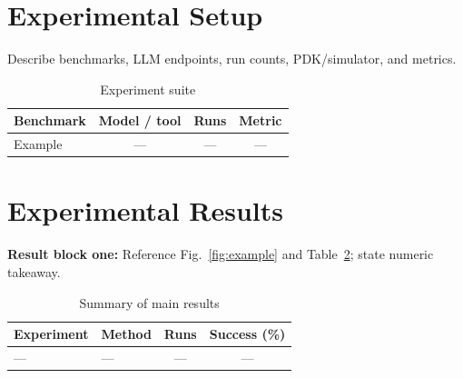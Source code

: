 \section{Experimental Setup}
\label{sec:setup}

Describe benchmarks, LLM endpoints, run counts, PDK/simulator, and metrics.

\begin{table}[!t]
    \renewcommand{\arraystretch}{1.15}
    \caption{Experiment suite}
    \label{tab:setup}
    \centering
    \begin{tabular}{lccc}
        \toprule
        Benchmark & Model / tool & Runs & Metric \\
        \midrule
        Example & --- & --- & --- \\
        \bottomrule
    \end{tabular}
\end{table}

\section{Experimental Results}
\label{sec:results}

\noindent\textbf{Result block one:}
Reference Fig.~\ref{fig:example} and Table~\ref{tab:summary}; state numeric takeaway.

\begin{table}[!t]
    \renewcommand{\arraystretch}{1.2}
    \caption{Summary of main results}
    \label{tab:summary}
    \centering
    \begin{tabular}{llcc}
        \toprule
        Experiment & Method & Runs & Success (\%) \\
        \midrule
        --- & --- & --- & --- \\
        \bottomrule
    \end{tabular}
\end{table}

